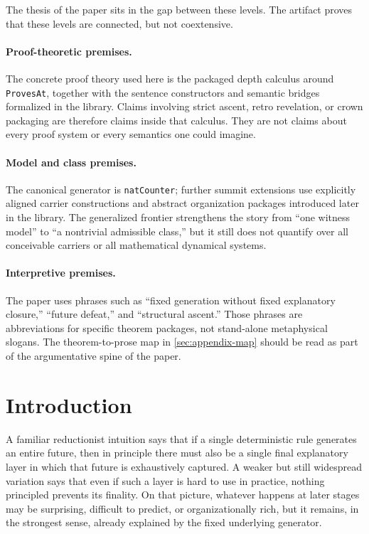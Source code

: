 \documentclass[11pt,a4paper]{article}
\theoremstyle{definition}
\begin{document}
The thesis of the paper sits in the gap between these levels. The artifact proves that these levels are connected, but not coextensive.

\paragraph{Proof-theoretic premises.}
The concrete proof theory used here is the packaged depth calculus around \texttt{ProvesAt}, together with the sentence constructors and semantic bridges formalized in the library. Claims involving strict ascent, retro revelation, or crown packaging are therefore claims inside that calculus. They are not claims about every proof system or every semantics one could imagine.

\paragraph{Model and class premises.}
The canonical generator is \texttt{natCounter}; further summit extensions use explicitly aligned carrier constructions and abstract organization packages introduced later in the library. The generalized frontier strengthens the story from ``one witness model'' to ``a nontrivial admissible class,'' but it still does not quantify over all conceivable carriers or all mathematical dynamical systems.

\paragraph{Interpretive premises.}
The paper uses phrases such as ``fixed generation without fixed explanatory closure,'' ``future defeat,'' and ``structural ascent.'' Those phrases are abbreviations for specific theorem packages, not stand-alone metaphysical slogans. The theorem-to-prose map in \cref{sec:appendix-map} should be read as part of the argumentative spine of the paper.

\section{Introduction}\label{sec:intro}

A familiar reductionist intuition says that if a single deterministic rule generates an entire future, then in principle there must also be a single final explanatory layer in which that future is exhaustively captured. A weaker but still widespread variation says that even if such a layer is hard to use in practice, nothing principled prevents its finality. On that picture, whatever happens at later stages may be surprising, difficult to predict, or organizationally rich, but it remains, in the strongest sense, already explained by the fixed underlying generator.
\end{document}
